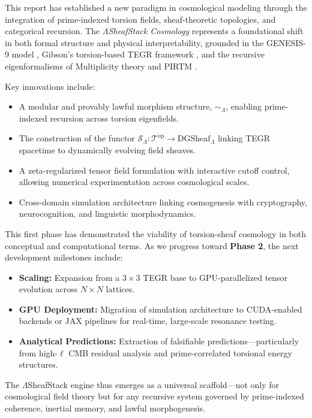 \documentclass{article}
\theoremstyle{plain}
\begin{document}
This report has established a new paradigm in cosmological modeling through the integration of prime-indexed torsion fields, sheaf-theoretic topologies, and categorical recursion. The \textit{$\Lambda$SheafStack Cosmology} represents a foundational shift in both formal structure and physical interpretability, grounded in the GENESIS-9 model \cite{sorensen2025genesis}, Gibson’s torsion-based TEGR framework \cite{gibson2025field, gibson2025overview}, and the recursive eigenformalisms of Multiplicity theory and PIRTM \cite{vanGelder2025Multiplicity, vanGelder2025PIRTM}.

Key innovations include:

\begin{itemize}
    \item A modular and provably lawful morphism structure, $\sim_\Lambda$, enabling prime-indexed recursion across torsion eigenfields.
    \item The construction of the functor $\mathcal{S}_\Lambda : \mathcal{T}^{\text{op}} \to \text{DGSheaf}_\Lambda$ linking TEGR spacetime to dynamically evolving field sheaves.
    \item A zeta-regularized tensor field formulation with interactive cutoff control, allowing numerical experimentation across cosmological scales.
    \item Cross-domain simulation architecture linking cosmogenesis with cryptography, neurocognition, and linguistic morphodynamics.
\end{itemize}

This first phase has demonstrated the viability of torsion-sheaf cosmology in both conceptual and computational terms. As we progress toward \textbf{Phase 2}, the next development milestones include:

\begin{itemize}
    \item \textbf{Scaling:} Expansion from a $3\times3$ TEGR base to GPU-parallelized tensor evolution across $N\times N$ lattices.
    \item \textbf{GPU Deployment:} Migration of simulation architecture to CUDA-enabled backends or JAX pipelines for real-time, large-scale resonance testing.
    \item \textbf{Analytical Predictions:} Extraction of falsifiable predictions—particularly from high-$\ell$ CMB residual analysis and prime-correlated torsional energy structures.
\end{itemize}

The $\Lambda$SheafStack engine thus emerges as a universal scaffold—not only for cosmological field theory but for any recursive system governed by prime-indexed coherence, inertial memory, and lawful morphogenesis.
\end{document}

